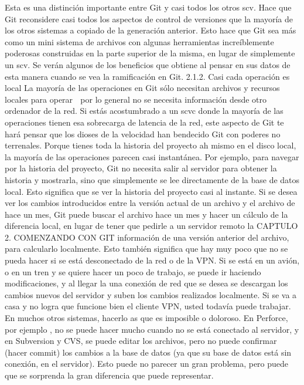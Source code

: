 \documentclass[12pt, spanish, oneside, onecolumn, a4paper]{report}
\begin{document}
Esta es una distinción importante entre Git y casi todos los otros \gls{scv}. Hace que Git reconsidere casi todos los aspectos de control de versiones que la mayoría de los otros sistemas a copiado de la generación anterior. Esto hace que Git sea más como un mini sistema de archivos con algunas herramientas increíblemente poderosas construidas en la parte superior de la misma, en lugar de simplemente un \gls{scv}. Se verán algunos de los beneficios que obtiene al pensar en sus datos de esta manera cuando se vea la ramificación en Git.
2.1.2. Casi cada operación es local
La mayoría de las operaciones en Git sólo necesitan archivos y recursos locales para operar   por lo general no se necesita información desde otro ordenador de la red. Si estás acostumbrado a un \gls{scvc} donde la mayoría de las operaciones tienen esa sobrecarga de latencia de la red, este aspecto de Git te hará pensar que los dioses de la velocidad han bendecido Git con poderes no terrenales. Porque tienes toda la historia del proyecto ah mismo en el disco local, la mayoría de las operaciones parecen casi instantánea.
Por ejemplo, para navegar por la historia del proyecto, Git no necesita salir al servidor para obtener la historia y mostrarla, sino que simplemente se lee directamente de la base de datos local. Esto significa que se ver la historia del proyecto casi al instante. Si se desea ver los cambios introducidos entre la versión actual de un archivo y el archivo de hace un mes, Git puede buscar el archivo hace un mes y hacer un cálculo de la diferencia local, en lugar de tener que pedirle a un servidor remoto la
 CAPTULO 2. COMENZANDO CON GIT información de una versión anterior del archivo, para calcularlo localmente.
Esto también significa que hay muy poco que no se pueda hacer si se está desconectado de la red o de la VPN. Si se está en un avión, o en un tren y se quiere hacer un poco de trabajo, se puede ir haciendo modificaciones, y al llegar la una conexión de red que se desea se descargan los cambios nuevos del servidor y suben los cambios realizados localmente. Si se va a casa y no logra que funcione bien el cliente VPN, usted todavía puede trabajar. En muchos otros sistemas, hacerlo as que es imposible o doloroso. En Perforce, por ejemplo , no se puede hacer mucho cuando no se está conectado al servidor, y en Subversion y CVS, se puede editar los archivos, pero no puede confirmar (hacer commit) los cambios a la base de datos (ya que su base de datos está sin conexión, en el servidor). Esto puede no parecer un gran problema, pero puede que se sorprenda la gran diferencia que puede representar.
\end{document}
